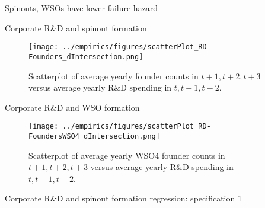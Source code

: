 \documentclass[english,usenames,dvipsnames]{beamer}
\begin{document}
\begin{frame}{Spinouts, WSOs have lower failure hazard}
\begin{table}
\tiny
\centering

\caption{\footnotesize The regresssions above compare the \textbf{\alert{failure rate}} in WSO4 spinouts, non-WSO4 spinouts and non-spinouts. The first regression uses no controls. The following three regressions in addition control for year effects, age effects, and / or cohort effects, in each case allowing the relevant effect to differ by State-NAICS4 combination. Standard errors are multi-way clustered at the state, NAICS4 and year levels.}
\end{table}
\end{frame}


\begin{frame}{Corporate R\&D and spinout formation}
	\begin{figure}[!htb]
		\centering
		\texttt{[image: ../empirics/figures/scatterPlot\_RD-Founders\_dIntersection.png]}
		\caption{Scatterplot of average yearly founder counts in $t+1,t+2,t+3$ versus average yearly R\&D spending in $t,t-1,t-2$.}
	\end{figure}
\end{frame}

\begin{frame}{Corporate R\&D and WSO formation}

\begin{figure}[!htb]
	\centering
	\texttt{[image: ../empirics/figures/scatterPlot\_RD-FoundersWSO4\_dIntersection.png]}
	\caption{Scatterplot of average yearly WSO4 founder counts in $t+1,t+2,t+3$ versus average yearly R\&D spending in $t,t-1,t-2$.}
	\end{figure}
\end{frame}



\begin{frame}{Corporate R\&D and spinout formation regression: specification 1}
	\begin{table}
		\Tiny
		\centering
		
		\caption{\tiny The dependent variable is average yearly number of founders joining startups in years $t+1,t+2,t+3$. The independent variables are averages over $t,t-1,t-2$. Firm controls are employment, assets, intangible assets, investment, net income, cumulative citation-weighted patents, and the product of Tobin's Q and Assets. Standard errors are clustered by firm.}
	\end{table}
\end{frame}
\end{document}
